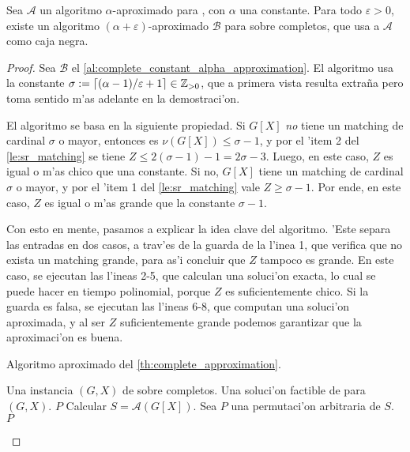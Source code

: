 \begin{theorem}
\label{th:complete_approximation}

Sea $\mathcal{A}$ un algoritmo $\alpha$-aproximado para , con $\alpha$ una constante. Para todo $\varepsilon > 0$, existe un algoritmo $(\alpha + \varepsilon)$-aproximado $\mathcal{B}$ para  sobre completos, que usa a $\mathcal{A}$ como caja negra.

\begin{proof}

Sea $\mathcal{B}$ el \autoref{al:complete_constant_alpha_approximation}. El algoritmo usa la constante $\sigma := \left\lceil (\alpha - 1) / \varepsilon + 1 \right\rceil \in \mathbb{Z}_{> 0}$, que a primera vista resulta extra\~na pero toma sentido m'as adelante en la demostraci'on.

El algoritmo se basa en la siguiente propiedad. Si $G[X]$ \emph{no} tiene un matching de cardinal $\sigma$ o mayor, entonces es $\nu(G[X]) \leq \sigma - 1$, y por el 'item 2 del \autoref{le:sr_matching} se tiene $Z \leq 2 (\sigma - 1) - 1 = 2 \sigma - 3$. Luego, en este caso, $Z$ es igual o m'as chico que una constante. Si no, $G[X]$ tiene un matching de cardinal $\sigma$ o mayor, y por el 'item 1 del \autoref{le:sr_matching} vale $Z \geq \sigma - 1$. Por ende, en este caso, $Z$ es igual o m'as grande que la constante $\sigma - 1$.

Con esto en mente, pasamos a explicar la idea clave del algoritmo. 'Este separa las entradas en dos casos, a trav'es de la guarda de la l'inea 1, que verifica que no exista un matching grande, para as'i concluir que $Z$ tampoco es grande. En este caso, se ejecutan las l'ineas 2-5, que calculan una soluci'on exacta, lo cual se puede hacer en tiempo polinomial, porque $Z$ es suficientemente chico. Si la guarda es falsa, se ejecutan las l'ineas 6-8, que computan una soluci'on aproximada, y al ser $Z$ suficientemente grande podemos garantizar que la aproximaci'on es buena.

\begin{algorithm}
  \caption{Algoritmo aproximado del \autoref{th:complete_approximation}.}
  \label{al:complete_constant_alpha_approximation}
  \begin{algorithmic}[1]
  	\Require Una instancia $(G, X)$ de  sobre completos.
  	\Ensure Una soluci'on factible de  para $(G, X)$.
					\Return $P$
				\EndIf
			\EndFor
		\EndFor
  	\EndIf
  	\State Calcular $S = \mathcal{A}(G[X])$.
	\State Sea $P$ una permutaci'on arbitraria de $S$.
	\Return $P$
  \end{algorithmic}
\end{algorithm}


\end{proof}
\end{theorem}
